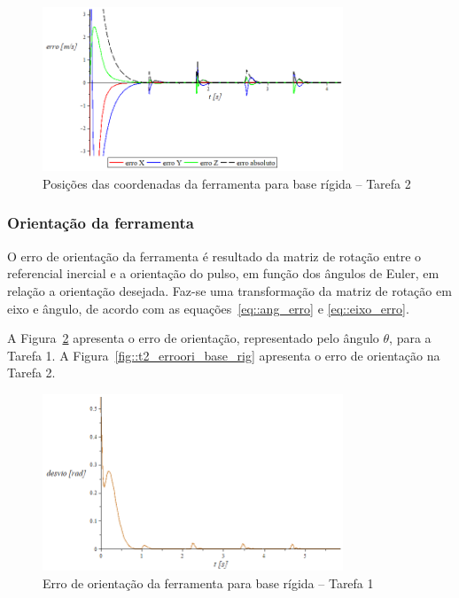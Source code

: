 \begin{figure}[h!]
	\centering 
 	\includegraphics[width=0.80\textwidth]{figs/t2_errovelf_base_rig}
 	\caption{Posições das coordenadas da ferramenta para base rígida -- Tarefa 2}
 	\label{fig::t2_errovelf_base_rig}
\end{figure}

\subsubsection{Orientação da ferramenta}

O erro de orientação da ferramenta é resultado da matriz de rotação entre o
referencial inercial e a orientação do pulso, em função dos ângulos de Euler, em
relação a orientação desejada. Faz-se uma transformação da matriz de rotação em
eixo e ângulo, de acordo com as equações~\ref{eq::ang_erro} e
\ref{eq::eixo_erro}.

A Figura~\ref{fig::t1_erroori_base_rig} apresenta o erro de orientação,
representado pelo ângulo $\theta$, para a Tarefa 1. A
Figura~\ref{fig::t2_erroori_base_rig} apresenta o erro de orientação na Tarefa 2.

\begin{figure}[h!]
	\centering 
 	\includegraphics[width=0.80\textwidth]{figs/t1_erroori_base_rig}
 	\caption{Erro de orientação da ferramenta para base rígida -- Tarefa
 	1}
 	\label{fig::t1_erroori_base_rig}
\end{figure}



